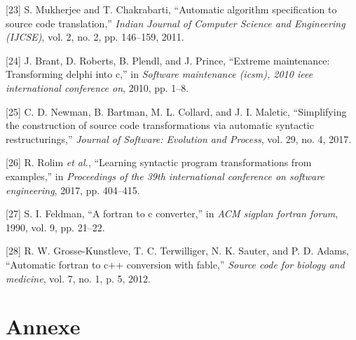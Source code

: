 \documentclass[11pt,]{article}
\begin{document}
\leavevmode\hypertarget{ref-mukherjee2011automatic}{}%
{[}23{]} S. Mukherjee and T. Chakrabarti, ``Automatic algorithm
specification to source code translation,'' \emph{Indian Journal of
Computer Science and Engineering (IJCSE)}, vol. 2, no. 2, pp. 146--159,
2011.

\leavevmode\hypertarget{ref-brant2010extreme}{}%
{[}24{]} J. Brant, D. Roberts, B. Plendl, and J. Prince, ``Extreme
maintenance: Transforming delphi into c,'' in \emph{Software maintenance
(icsm), 2010 ieee international conference on}, 2010, pp. 1--8.

\leavevmode\hypertarget{ref-newman2017simplifying}{}%
{[}25{]} C. D. Newman, B. Bartman, M. L. Collard, and J. I. Maletic,
``Simplifying the construction of source code transformations via
automatic syntactic restructurings,'' \emph{Journal of Software:
Evolution and Process}, vol. 29, no. 4, 2017.

\leavevmode\hypertarget{ref-rolim2017learning}{}%
{[}26{]} R. Rolim \emph{et al.}, ``Learning syntactic program
transformations from examples,'' in \emph{Proceedings of the 39th
international conference on software engineering}, 2017, pp. 404--415.

\leavevmode\hypertarget{ref-feldman1990fortran}{}%
{[}27{]} S. I. Feldman, ``A fortran to c converter,'' in \emph{ACM
sigplan fortran forum}, 1990, vol. 9, pp. 21--22.

\leavevmode\hypertarget{ref-grosse2012automatic}{}%
{[}28{]} R. W. Grosse-Kunstleve, T. C. Terwilliger, N. K. Sauter, and P.
D. Adams, ``Automatic fortran to c++ conversion with fable,''
\emph{Source code for biology and medicine}, vol. 7, no. 1, p. 5, 2012.

\newpage

\hypertarget{annexe}{%
\section{Annexe}\label{annexe}}
\end{document}
